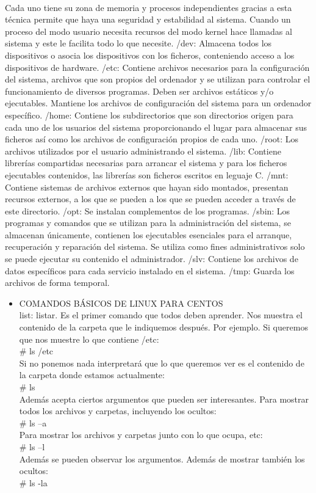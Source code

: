 \begin{itemize}
\\Cada uno tiene su zona de memoria y procesos independientes gracias a esta técnica permite que haya una seguridad y estabilidad al sistema. Cuando un proceso del modo usuario necesita recursos del modo kernel hace llamadas al sistema y este le facilita todo lo que necesite. /dev: Almacena todos los dispositivos o asocia los dispositivos con los ficheros, conteniendo acceso a los dispositivos de hardware. /etc: Contiene archivos necesarios para la configuración del sistema, archivos que son propios del ordenador y se utilizan para controlar el funcionamiento de diversos programas. Deben ser archivos estáticos y/o ejecutables. Mantiene los archivos de configuración del sistema para un ordenador específico. /home: Contiene los subdirectorios que son directorios origen para cada uno de los usuarios del sistema proporcionando el lugar para almacenar sus ficheros así como los archivos de configuración propios de cada uno. /root: Los archivos utilizados por el usuario administrando el sistema. /lib: Contiene librerías compartidas necesarias para arrancar el sistema y para los ficheros ejecutables contenidos, las librerías son ficheros escritos en leguaje C. /mnt: Contiene sistemas de archivos externos que hayan sido montados, presentan recursos externos, a los que se pueden a los que se pueden acceder a través de este directorio. /opt: Se instalan complementos de los programas. /sbin: Los programas y comandos que se utilizan para la administración del sistema, se almacenan únicamente, contienen los ejecutables esenciales para el arranque, recuperación y reparación del sistema. Se utiliza como fines administrativos solo se puede ejecutar su contenido el administrador. /slv: Contiene los archivos de datos específicos para cada servicio instalado en el sistema. /tmp: Guarda los archivos de forma temporal.
\\
\end{itemize} 

\begin{itemize}
    \item COMANDOS BÁSICOS DE LINUX PARA CENTOS
    \\list: listar. Es el primer comando que todos deben aprender. Nos muestra el contenido de la carpeta que le indiquemos después. Por ejemplo. Si queremos que nos muestre lo que contiene /etc:
    \\# ls /etc
    \\Si no ponemos nada interpretará que lo que queremos ver es el contenido de la carpeta donde estamos actualmente:
    \\# ls
    \\Además acepta ciertos argumentos que pueden ser interesantes. Para mostrar todos los archivos y carpetas, incluyendo los ocultos:
    \\# ls –a
    \\Para mostrar los archivos y carpetas junto con lo que ocupa, etc:
    \\# ls –l
    \\ Además se pueden observar los argumentos. Además de mostrar también los ocultos:
    \\# ls -la

\end{itemize}

